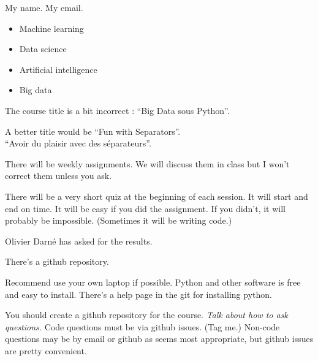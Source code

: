




My name.  My email.

\begin{itemize}
\item Machine learning
\item Data science
\item Artificial intelligence
\item Big data
\end{itemize}

The course title is a bit incorrect : ``Big Data sous Python''.

A better title would be ``Fun with Separators''.\\
``Avoir du plaisir avec des séparateurs''.

There will be weekly assignments.  We will discuss them in class but I
won't correct them unless you ask.

There will be a very short quiz at the beginning of each session.  It
will start and end on time.  It will be easy if you did the
assignment.  If you didn't, it will probably be impossible.
(Sometimes it will be writing code.)

Olivier Darné has asked for the results.

\bigskip

There's a github repository.

Recommend use your own laptop if possible.  Python and other software
is free and easy to install.  There's a help page in the git for
installing python.

You should create a github repository for the course.  \textit{Talk
  about how to ask questions.}  Code questions must be via github
issues.  (Tag me.)  Non-code questions may be by email or github as
seems most appropriate, but github issues are pretty convenient.


